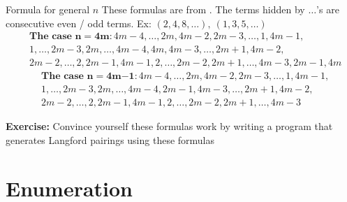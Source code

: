 \documentclass[aspectratio=169]{beamer}
\begin{document}
\begin{frame}{Formula for general $n$}
    These formulas are from \cite{Langford4m}. The terms hidden by $\ldots$'s are consecutive even / odd terms. Ex: $(2, 4, 8, \ldots),~ (1, 3, 5, \ldots)$ \pause
    \begin{equation*}
    \begin{split}
        & \textbf{The case }{\boldsymbol n \boldsymbol = \boldsymbol 4 \boldsymbol m \boldsymbol \colon } 4m - 4, \ldots, 2m, 4m - 2, 2m - 3, \ldots, 1, 4m - 1, \\
        & 1, \ldots, 2m - 3, 2m, \ldots, 4m - 4, 4m, 4m - 3, \ldots, 2m + 1, 4m - 2, \\
        & 2m - 2, \ldots, 2, 2m - 1, 4m - 1, 2, \ldots, 2m - 2, 2m + 1, \ldots, 4m - 3, 2m - 1, 4m
    \end{split}    
    \end{equation*} \pause
    \begin{equation*}
    \begin{split}
        & \textbf{The case }{\boldsymbol n \boldsymbol = \boldsymbol 4 \boldsymbol m \boldsymbol - \boldsymbol 1 \boldsymbol \colon } 4m - 4, \ldots, 2m, 4m - 2, 2m - 3, \ldots, 1, 4m - 1, \\
        & 1, \ldots, 2m - 3, 2m, \ldots, 4m - 4, 2m - 1, 4m - 3, \ldots, 2m + 1, 4m - 2, \\
        & 2m - 2, \ldots, 2, 2m - 1, 4m - 1, 2, \ldots, 2m - 2, 2m + 1, \ldots, 4m - 3
    \end{split}
    \end{equation*} \pause
    
    \textcolor{sigma@alertred}{\textbf{Exercise:}} Convince yourself these formulas work by writing a program that generates Langford pairings using these formulas
\end{frame}

\section{Enumeration}
\frame{\sectionpage}
\end{document}
